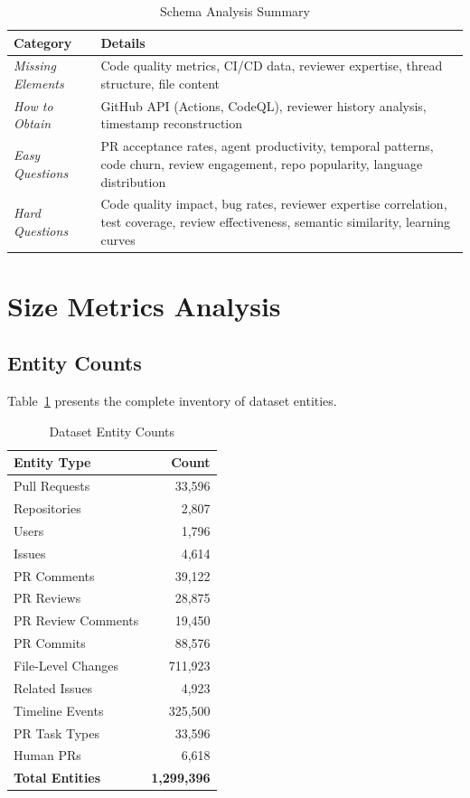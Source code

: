 \documentclass[11pt]{article}
\begin{document}
\begin{table}[H]
\centering
\caption{Schema Analysis Summary}
\small
\begin{tabular}{@{}p{4cm}p{9cm}@{}}
\toprule
\textbf{Category} & \textbf{Details} \\
\midrule
\textit{Missing Elements} & Code quality metrics, CI/CD data, reviewer expertise, thread structure, file content \\
\textit{How to Obtain} & GitHub API (Actions, CodeQL), reviewer history analysis, timestamp reconstruction \\
\midrule
\textit{Easy Questions} & PR acceptance rates, agent productivity, temporal patterns, code churn, review engagement, repo popularity, language distribution \\
\textit{Hard Questions} & Code quality impact, bug rates, reviewer expertise correlation, test coverage, review effectiveness, semantic similarity, learning curves \\
\bottomrule
\end{tabular}
\end{table}

\section{Size Metrics Analysis}

\subsection{Entity Counts}

Table~\ref{tab:entity_counts} presents the complete inventory of dataset entities.

\begin{table}[H]
\centering
\caption{Dataset Entity Counts}
\label{tab:entity_counts}
\begin{tabular}{@{}lr@{}}
\toprule
\textbf{Entity Type} & \textbf{Count} \\
\midrule
Pull Requests & 33,596 \\
Repositories & 2,807 \\
Users & 1,796 \\
Issues & 4,614 \\
PR Comments & 39,122 \\
PR Reviews & 28,875 \\
PR Review Comments & 19,450 \\
PR Commits & 88,576 \\
File-Level Changes & 711,923 \\
Related Issues & 4,923 \\
Timeline Events & 325,500 \\
PR Task Types & 33,596 \\
Human PRs & 6,618 \\
\midrule
\textbf{Total Entities} & \textbf{1,299,396} \\
\bottomrule
\end{tabular}
\end{table}
\end{document}
